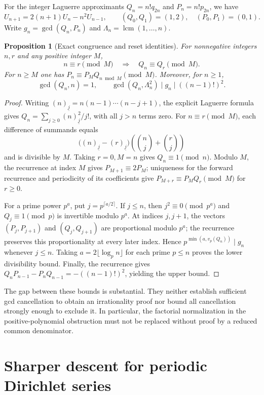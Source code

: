 \documentclass[11pt,a4paper]{article}
\newtheorem{proposition}[theorem]{Proposition}
\theoremstyle{definition}
\theoremstyle{remark}
\numberwithin{equation}{section}
\begin{document}
For the integer Laguerre approximants $Q_n=n!q_{2n}$ and $P_n=n!p_{2n}$,
we have
\[
 U_{n+1}=2(n+1)U_n-n^2U_{n-1},\qquad
 (Q_0,Q_1)=(1,2),\quad(P_0,P_1)=(0,1).
\]
Write $g_n=\gcd(Q_n,P_n)$ and $\Lambda_n=\operatorname{lcm}(1,\ldots,n)$.
\begin{proposition}[Exact congruence and reset identities]
For nonnegative integers $n,r$ and any positive integer $M$,
\[
 n\equiv r\pmod M\quad\Longrightarrow\quad Q_n\equiv Q_r\pmod M.
\]
For $n\ge M$ one has
$P_n\equiv P_MQ_{n\bmod M}\pmod M$.
Moreover, for $n\ge1$,
\[
 \gcd(Q_n,n)=1,\qquad
 \gcd(Q_n,\Lambda_n^2)\mid g_n\mid((n-1)!)^2.
\]
\end{proposition}
\begin{proof}
Writing $(n)_{\underline j}=n(n-1)\cdots(n-j+1)$, the explicit Laguerre
formula gives
$Q_n=\sum_{j\ge0}(n)_{\underline j}^2/j!$, with all $j>n$ terms zero.
For $n\equiv r\pmod M$, each difference of summands equals
\[
 \bigl((n)_{\underline j}-(r)_{\underline j}\bigr)
 \left(\binom nj+\binom rj\right)
\]
and is divisible by $M$.  Taking $r=0,M=n$ gives $Q_n\equiv1\pmod n$.
Modulo $M$, the recurrence at index $M$ gives $P_{M+1}\equiv2P_M$;
uniqueness for the forward recurrence and periodicity of its
coefficients give $P_{M+r}\equiv P_M Q_r\pmod M$ for $r\ge0$.

For a prime power $p^a$, put $j=p^{\lceil a/2\rceil}$.  If $j\le n$,
then $j^2\equiv0\pmod{p^a}$ and $Q_j\equiv1\pmod p$ is invertible
modulo $p^a$.  At indices $j,j+1$, the vectors $(P_j,P_{j+1})$ and
$(Q_j,Q_{j+1})$ are proportional modulo $p^a$; the recurrence preserves
this proportionality at every later index.  Hence
$p^{\min(a,v_p(Q_n))}\mid g_n$ whenever $j\le n$.  Taking
$a=2\lfloor\log_p n\rfloor$ for each prime $p\le n$ proves the lower
divisibility bound.  Finally, the recurrence gives
$Q_nP_{n-1}-P_nQ_{n-1}=-((n-1)!)^2$, yielding the upper bound.
\end{proof}

The gap between these bounds is substantial.  They neither establish
sufficient gcd cancellation to obtain an irrationality proof nor bound
all cancellation strongly enough to exclude it.  In particular, the
factorial normalization in the positive-polynomial obstruction must not
be replaced without proof by a reduced common denominator.


\section{Sharper descent for periodic Dirichlet series}
\label{p2:r2nt-section}
\end{document}
